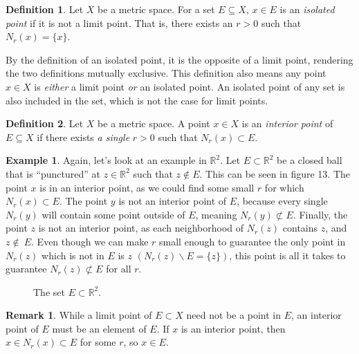 \documentclass{article}
\newcommand{\R}{\mathbb{R}}
\theoremstyle{definition}
\newtheorem{definition}{Definition}[section]
\newtheorem{example}{Example}[section]
\newtheorem{remark}{Remark}[section]
\begin{document}
\begin{definition}
		Let $ X $ be a metric space. For a set $ E\subseteq X $, $ x\in E $ is an \textit{\color{red}isolated point} if it is not a limit point. That is, there exists an $ r>0 $ such that $ N_r(x)=\{x\} $. 
\end{definition}
By the definition of an isolated point, it is the opposite of a limit point, rendering the two definitions mutually exclusive. This definition also means any point $ x\in X $ is \textit{either} a limit point \textit{or} an isolated point.  An isolated point of any set is also included in the set, which is not the case for limit points. 
\begin{definition}
Let $ X $ be a metric space. A point $ x\in X$ is an \textit{\color{red}interior point} of $ E\subseteq X $ if there exists \textit{a single} $ r>0 $ such that $ N_r(x)\subset E $. 
\end{definition}
\begin{example}
	Again, let's look at an example in $ \R^2 $. Let $ E\subset \R^2 $ be a closed ball that is ``punctured'' at $ z\in\R^2 $ such that $ z\notin E$. This can be seen in figure 13. The point $ x $ is in an interior point, as we could find some small $ r $ for which $ N_r(x)\subset E $. The point $ y $ is not an interior point of $ E $, because every single $ N_r(y) $ will contain some point outside of $ E $, meaning $ N_r(y)\not\subset E $. Finally, the point $ z $ is not an interior point, as each neighborhood of $ N_r(z) $ contains $ z $, and $ z\notin\ E $. Even though we can make $ r $ small enough to guarantee the only point in $ N_r(z) $ which is not in $ E $ is $ z $ $ (N_r(z)\backslash E=\{z\}) $, this point is all it takes to guarantee $ N_r(z)\not\subset E $ for all $ r $. 
\begin{figure}[h]
	\centering
	\caption{The set $ E\subset \R^2 $.}
\end{figure}	
\end{example}
\begin{remark}
	While a limit point of $ E\subset X $ need not be a point in $ E $, an interior point of $ E $ must be an element of $ E $. If $ x $ is an interior point, then $ x\in N_r(x)\subset E $ for some $ r $, so $ x\in E $. 
\end{remark}
\end{document}
